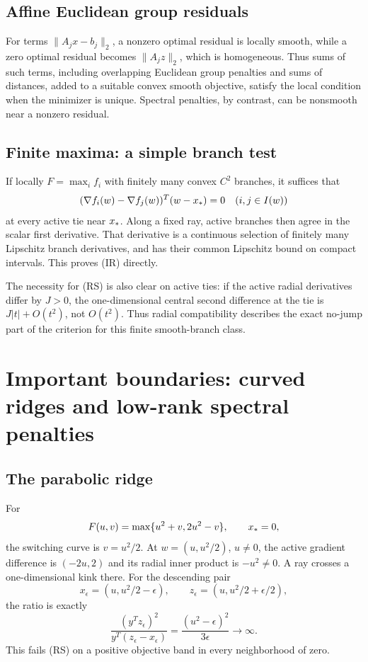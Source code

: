 

\subsection{Affine Euclidean group residuals}
For terms $\|A_jx-b_j\|_2$, a nonzero optimal residual is locally smooth, while a zero optimal residual becomes $\|A_jz\|_2$, which is homogeneous. Thus sums of such terms, including overlapping Euclidean group penalties and sums of distances, added to a suitable convex smooth objective, satisfy the local condition when the minimizer is unique. Spectral penalties, by contrast, can be nonsmooth near a nonzero residual.



\subsection{Finite maxima: a simple branch test}
If locally $F=\max_i f_i$ with finitely many convex $C^2$ branches, it suffices that
\[
 (\nabla f_i(w)-\nabla f_j(w))^T(w-x_*)=0
 \quad(i,j\in I(w))
\]
at every active tie near $x_*$. Along a fixed ray, active branches then agree in the scalar first derivative. That derivative is a continuous selection of finitely many Lipschitz branch derivatives, and has their common Lipschitz bound on compact intervals. This proves (IR) directly.

The necessity for (RS) is also clear on active ties: if the active radial derivatives differ by $J>0$, the one-dimensional central second difference at the tie is $J|t|+O(t^2)$, not $O(t^2)$. Thus radial compatibility describes the exact no-jump part of the criterion for this finite smooth-branch class.


\setcounter{section}{6}
\setcounter{theorem}{0}
\setcounter{equation}{8}


\section{Important boundaries: curved ridges and low-rank spectral penalties}


\subsection{The parabolic ridge}
For
\[
 F(u,v)=\max\{u^2+v,2u^2-v\},\qquad x_*=0,
\]
the switching curve is $v=u^2/2$. At $w=(u,u^2/2)$, $u\ne0$, the active gradient difference is $(-2u,2)$ and its radial inner product is $-u^2\ne0$. A ray crosses a one-dimensional kink there. For the descending pair
\[
 x_\epsilon=(u,u^2/2-\epsilon),\qquad
 z_\epsilon=(u,u^2/2+\epsilon/2),
\]
the ratio is exactly
\[
 \frac{(y^Tz_\epsilon)^2}{y^T(z_\epsilon-x_\epsilon)}
 =\frac{(u^2-\epsilon)^2}{3\epsilon}\to\infty.
\]
This fails (RS) on a positive objective band in every neighborhood of zero.

